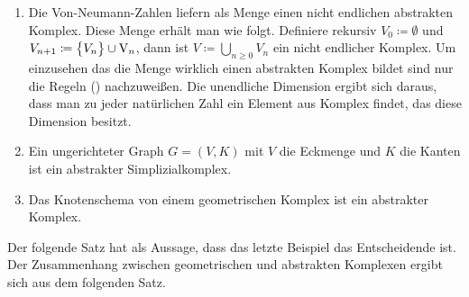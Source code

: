 \begin{Bsp}
\begin{enumerate}[\textbullet]
  \item Die Von-Neumann-Zahlen liefern als Menge einen nicht endlichen
    abstrakten Komplex.  Diese Menge erhält man wie folgt. Definiere
    rekursiv $V_0 \coloneqq \emptyset$ und
    $V_{n+1} \coloneqq \bigl\{ V_n \bigr\} \cup \operatorname{V}_n$, dann ist
    $V \coloneqq \bigcup\limits_{n \geq 0} V_n$ ein nicht endlicher
    Komplex. Um einzusehen das die Menge wirklich einen abstrakten
    Komplex bildet sind nur die Regeln (\textbullet) nachzuweißen.
    Die unendliche Dimension ergibt sich daraus, dass man zu jeder
    natürlichen Zahl ein Element aus Komplex findet, das diese
    Dimension besitzt.
    
  \item Ein ungerichteter Graph $G=(V,K)$ mit $V$ die Eckmenge und $K$
    die Kanten ist ein abstrakter Simplizialkomplex.
  \item Das Knotenschema von einem geometrischen Komplex ist ein
    abstrakter Komplex.
  \end{enumerate}
\end{Bsp}

Der folgende Satz hat als Aussage, dass das letzte Beispiel das
Entscheidende ist. Der Zusammenhang zwischen geometrischen und
abstrakten Komplexen ergibt sich aus dem folgenden Satz.



